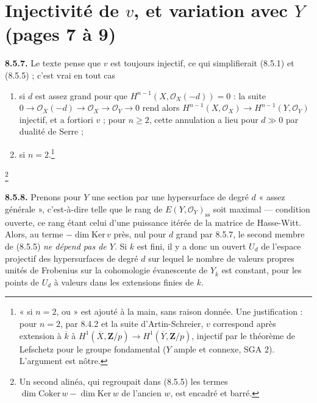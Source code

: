 \documentclass[11pt,a4paper]{article}
\begin{document}
\section*{Injectivité de $v$, et variation avec $Y$ (pages 7 à 9)}

\textbf{8.5.7.} Le texte pense que $v$ est toujours injectif, ce qui
simplifierait (8.5.1) et (8.5.5) ; c'est vrai en tout cas
\begin{enumerate}
\item[(i)] si $d$ est assez grand pour que $H^{n-1}(X, \mathcal{O}_{X}(-d))
= 0$ : la suite $0 \to \mathcal{O}_{X}(-d) \to \mathcal{O}_{X} \to
\mathcal{O}_{Y} \to 0$ rend alors $H^{n-1}(X, \mathcal{O}_{X}) \to
H^{n-1}(Y, \mathcal{O}_{Y})$ injectif, et a fortiori $v$ ; pour $n \geq 2$,
cette annulation a lieu pour $d \gg 0$ par dualité de Serre ;
\item[(ii)] si $n = 2$.\footnote{« si $n = 2$, ou » est ajouté à la main, sans
raison donnée. Une justification : pour $n = 2$, par 8.4.2 et la suite
d'Artin-Schreier, $v$ correspond après extension à $\overline{k}$ à
$H^{1}(\overline{X}, \mathbf{Z}/p) \to H^{1}(\overline{Y}, \mathbf{Z}/p)$,
injectif par le théorème de Lefschetz pour le groupe fondamental ($Y$
ample et connexe, SGA 2). L'argument est nôtre.}
\end{enumerate}
\footnote{Un second alinéa, qui regroupait dans (8.5.5) les termes
$\dim \mathrm{Coker}\, w - \dim \mathrm{Ker}\, w$ de l'ancien $w$, est encadré
et barré.}

\textbf{8.5.8.} Prenons pour $Y$ une section par une hypersurface de degré
$d$ « assez générale », c'est-à-dire telle que le rang de
$E(Y, \mathcal{O}_{Y})_{\mathrm{ss}}$ soit maximal --- condition ouverte, ce
rang étant celui d'une puissance itérée de la matrice de Hasse-Witt. Alors,
au terme $- \dim \mathrm{Ker}\, v$ près, nul pour $d$ grand par 8.5.7, le
second membre de (8.5.5) \emph{ne dépend pas de $Y$}. Si $k$ est fini, il y a
donc un ouvert $U_{d}$ de l'espace projectif des hypersurfaces de degré $d$
sur lequel le nombre de valeurs propres unités de Frobenius sur la
cohomologie évanescente de $Y_{\overline{k}}$ est constant, pour les points de
$U_{d}$ à valeurs dans les extensions finies de $k$.
\end{document}
